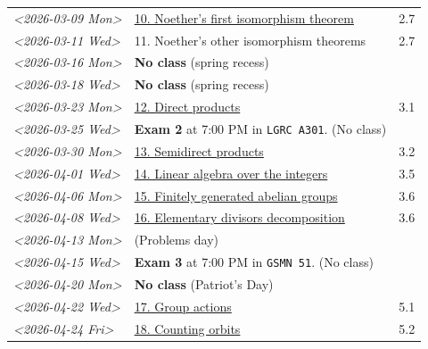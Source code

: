 \documentclass[11pt]{article}
\begin{document}
\begin{center}
\begin{tabular}{l|l|r}
\textit{<2026-03-09 Mon>} & \href{https://www.dropbox.com/scl/fi/5umx9xqjvzhxw28wvecpl/Lecture-10.pdf?rlkey=7o83fhinujrhqwrodnnmg0mco\&dl=0}{10. Noether's first isomorphism theorem} & 2.7\\[0pt]
\textit{<2026-03-11 Wed>} & 11. Noether's other isomorphism theorems & 2.7\\[0pt]
\textit{<2026-03-16 Mon>} & \textbf{No class} (spring recess) & \\[0pt]
\textit{<2026-03-18 Wed>} & \textbf{No class} (spring recess) & \\[0pt]
\textit{<2026-03-23 Mon>} & \href{https://www.dropbox.com/scl/fi/yogahfmerlrevbc65y30r/Lecture-11.pdf?rlkey=w71u05arfw3kzyqiehc1ufx7d\&dl=0}{12. Direct products} & 3.1\\[0pt]
\textit{<2026-03-25 Wed>} & \textbf{Exam 2} at 7:00 PM in \texttt{LGRC A301}. (No class) & \\[0pt]
\textit{<2026-03-30 Mon>} & \href{https://www.dropbox.com/scl/fi/jhwp7l0ykhttzsk74jsiq/Lecture-13.pdf?rlkey=89ua250me6pwwy68oqcl830t8\&dl=0}{13. Semidirect products} & 3.2\\[0pt]
\textit{<2026-04-01 Wed>} & \href{https://www.dropbox.com/scl/fi/qi7ztpadgkzfiei306ep2/Lecture-14.pdf?rlkey=7gsry779qqv2hq7xdxn48ebsm\&dl=0}{14. Linear algebra over the integers} & 3.5\\[0pt]
\textit{<2026-04-06 Mon>} & \href{https://www.dropbox.com/scl/fi/fsajexd86jw6dg0bhtoyk/Lecture-14.pdf?rlkey=ihw92clet9umsnutu9reqh7qm\&dl=0}{15. Finitely generated abelian groups} & 3.6\\[0pt]
\textit{<2026-04-08 Wed>} & \href{https://www.dropbox.com/scl/fi/2zfxo0q6uf7v2pwq5xnqs/Lecture-16.pdf?rlkey=9c7xhkeiv50d3fnq67wz5tqtm\&dl=0}{16. Elementary divisors decomposition} & 3.6\\[0pt]
\textit{<2026-04-13 Mon>} & (Problems day) & \\[0pt]
\textit{<2026-04-15 Wed>} & \textbf{Exam 3} at 7:00 PM in \texttt{GSMN 51}. (No class) & \\[0pt]
\textit{<2026-04-20 Mon>} & \textbf{No class} (Patriot's Day) & \\[0pt]
\textit{<2026-04-22 Wed>} & \href{https://www.dropbox.com/scl/fi/5qe7hwh5bejcstqb8wihe/Lecture-18.pdf?rlkey=vggwpqmhxmvyfyq5adlhdykk0\&dl=0}{17. Group actions} & 5.1\\[0pt]
\textit{<2026-04-24 Fri>} & \href{https://www.dropbox.com/scl/fi/5e0ct4ph7dcczk7dbdblx/Lecture-19.pdf?rlkey=ai8rn33avfbgkxzsaq0udtfq7\&dl=0}{18. Counting orbits} & 5.2\\[0pt]

\end{tabular}
\end{center}
\end{document}
